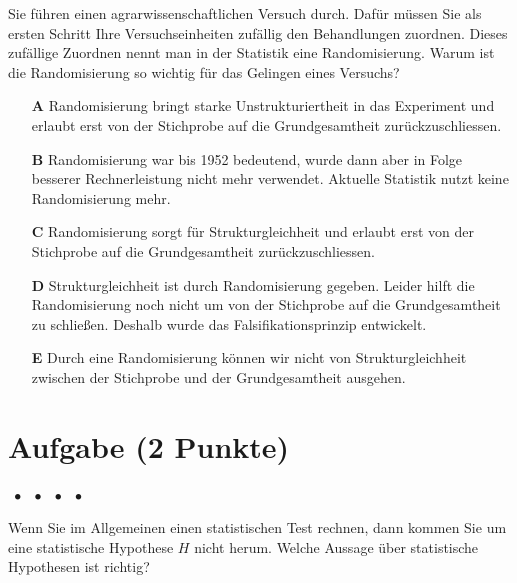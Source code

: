 \documentclass[a4paper, 9pt]{scrartcl}\usepackage[]{graphicx}\usepackage[]{xcolor}
\begin{document}
Sie führen einen agrarwissenschaftlichen Versuch durch. Dafür müssen Sie als ersten Schritt Ihre Versuchseinheiten zufällig den Behandlungen zuordnen. Dieses zufällige Zuordnen nennt man in der Statistik eine Randomisierung. Warum ist die Randomisierung so wichtig für das Gelingen eines Versuchs?



\begin{enumerate}
\item [\textbf{A} \msquare] Randomisierung bringt starke Unstrukturiertheit in das Experiment und erlaubt erst von der Stichprobe auf die Grundgesamtheit zurückzuschliessen.
\item [\textbf{B} \msquare] Randomisierung war bis 1952 bedeutend, wurde dann aber in Folge besserer Rechnerleistung nicht mehr verwendet. Aktuelle Statistik nutzt keine Randomisierung mehr.
\item [\textbf{C} \msquare] Randomisierung sorgt für Strukturgleichheit und erlaubt erst von der Stichprobe auf die Grundgesamtheit zurückzuschliessen.
\item [\textbf{D} \msquare] Strukturgleichheit ist durch Randomisierung gegeben. Leider hilft die Randomisierung noch nicht um von der Stichprobe auf die Grundgesamtheit zu schließen. Deshalb wurde das Falsifikationsprinzip entwickelt.
\item [\textbf{E} \msquare] Durch eine Randomisierung können wir nicht von Strukturgleichheit zwischen der Stichprobe und der Grundgesamtheit ausgehen.
\end{enumerate}

\section{Aufgabe \hfill (2 Punkte)}

\ifcollection
\begin{flushright}
\tiny\vspace{-2Ex}
\textbf{\examinhaltstart}
\exammodulemathstat $\;\bullet$
\exammodulestat $\;\bullet$
\exammodulestatbbv $\;\bullet$
\exammodulestatversuch $\;\bullet$
\exammodulebiostat
\vspace{-1Ex}
\end{flushright}
\fi




Wenn Sie im Allgemeinen einen statistischen Test rechnen, dann kommen Sie um eine statistische Hypothese $H$ nicht herum. Welche Aussage über statistische Hypothesen ist richtig?
\end{document}
